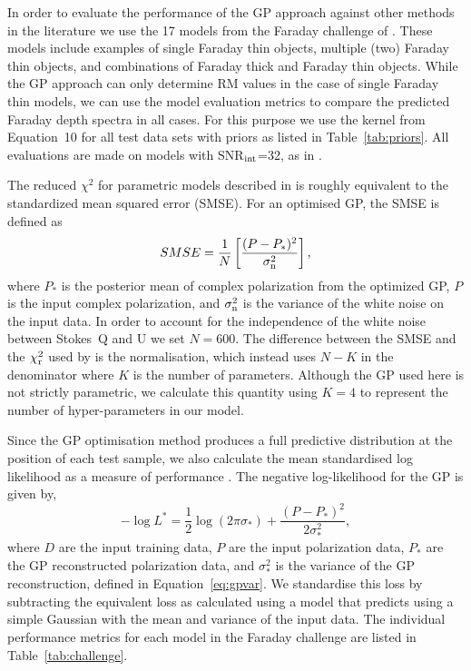 \documentclass[fleqn,usenatbib]{mnras}
\begin{document}
%
In order to evaluate the performance of the GP approach against other methods in the literature we use the 17 models from the Faraday challenge of \cite{Sun_2015}. These models include examples of single Faraday thin objects, multiple (two) Faraday thin objects, and combinations of  Faraday thick and Faraday thin objects. While the GP approach can only determine RM values in the case of single Faraday thin models, we can use the model evaluation metrics to compare the predicted Faraday depth spectra in all cases. For this purpose we use the kernel from Equation~10 for all test data sets with priors as listed in Table~\ref{tab:priors}. All evaluations are made on models with SNR$_{\rm int}$=32, as in \cite{Sun_2015}.

The reduced $\chi^2$ for parametric models described in \cite{Sun_2015} is roughly equivalent to the standardized mean squared error (SMSE). For an optimised GP, the SMSE is defined as
%
\begin{equation}
\label{eq:smse}
SMSE = \frac{1}{N}\left[ \frac{(P - P_{\ast})^2}{\sigma_{\rm n}^2}  \right],
\end{equation}
%
where $P_{\ast}$ is the posterior mean  of complex polarization from the optimized GP, $P$ is the input complex polarization, and $\sigma_{\rm n}^2$ is the variance of the white noise on the input data. In order to account for the independence of the white noise between Stokes~Q and U we set $N=600$. The difference between the SMSE and the $\chi^2_{\rm r}$ used by \cite{Sun_2015} is the normalisation, which instead uses $N-K$ in the denominator where $K$ is the number of parameters. Although the GP used here is not strictly parametric, we calculate this quantity using $K=4$ to represent the number of hyper-parameters in our model.

Since the GP optimisation method produces a full predictive distribution at the position of each test sample, we also calculate the mean standardised log likelihood as a measure of performance \citep{3569}. The negative log-likelihood for the GP is given by,
%
\begin{equation}
\label{eq:logl}
-\log L^{\ast} = \frac{1}{2}\log(2\pi \sigma_{\ast}) + \frac{(P - P_{\ast})^2}{2\sigma_{\ast}^2},
\end{equation}
%
where $D$ are the input training data, $P$ are the input polarization data, $P_{\ast}$ are the GP reconstructed polarization data, and $\sigma_{\ast}^2$ is the variance of the GP reconstruction, defined in Equation~\ref{eq:gpvar}.
We standardise this loss by subtracting the equivalent loss as calculated using a model that predicts using a simple Gaussian with the mean and variance of the input data. The individual performance metrics for each model in the Faraday challenge are listed in Table~\ref{tab:challenge}.
\end{document}
